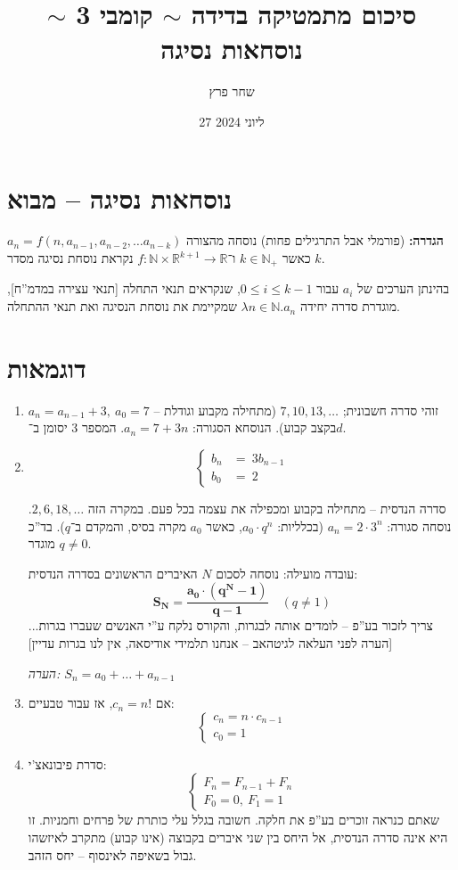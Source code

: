 \documentclass[]{article}
\author{שחר פרץ}
\title{סיכום מתמטיקה בדידה $\sim$ קומבי 3 $\sim$ נוסחאות נסיגה}
\date{27 ליוני 2024}
\newcommand\N     {\mathbb{N}}
\newcommand\R     {\mathbb{R}}
\begin{document}
	\maketitle
	
	\section{נוסחאות נסיגה – מבוא}
	\textbf{הגדרה: }(פורמלי אבל התרגילים פחות) נוסחה מהצורה $a_n = f(n, a_{n - 1}, a_{n - 2}, \dots a_{n - k})$ כאשר $k \in \N_+$ ו־$f \colon \N \times \R^{k + 1} \to \R$ נקראת נוסחת נסיגה מסדר $k$. 
	
	בהינתן הערכים של $a_i$ עבור $0 \le i \le k - 1$, שנקראים תנאי התחלה [תנאי עצירה במדמ''ח], מוגדרת סדרה יחידה $\lambda n \in \N. a_n$ שמקיימת את נוסחת הנסיגה ואת תנאי ההתחלה. 
	
	\section{דוגמאות}
	\begin{enumerate}
		\item $a_n = a_{n - 1} + 3, \ a_0 = 7$ – 
		זוהי סדרה חשבונית; $7, 10, 13, \dots $ (מתחילה מקבוע וגודלת בקצב קבוע). הנוסחא הסגורה: $a_n = 7 + 3n $. המספר $3$ יסומן ב־$d$. 
		\item \[ \begin{cases}
			b_n &= \ 3b_{n - 1} \\
			b_0 &= \ 2
		\end{cases} \]
		
		סדרה הנדסית – מתחילה בקבוע ומכפילה את עצמה בכל פעם. במקרה הזה $ 2, 6, 18, \dots $. נוסחה סגורה: $a_n = 2 \cdot 3^n $ (בכלליות: $a_0 \cdot q^n$, כאשר $a_0 $ מקרה בסיס, והמקדם ב־$q$). בד''כ מוגדר $q \neq 0 $. 
		
		עובדה מועילה: נוסחה לסכום $N$ האיברים הראשונים בסדרה הנדסית: 
		\[ \bm{S_N = \frac{a_0 \cdot (q^N - 1)}{q - 1}} \quad (q \neq 1) \]
		צריך לזכור בע''פ -- לומדים אותה לבגרות, והקורס נלקח ע''י האנשים שעברו בגרות...  [הערה לפני העלאה לגיטהאב – אנחנו תלמידי אודיסאה, אין לנו בגרות עדיין]
		
		\textit{הערה: $S_n = a_0 + \dots + a_{n - 1}$}
		\item אם $c_n = n!$, אז עבור טבעיים: 
		\[ \begin{cases}
			c_n = n \cdot c_{n - 1} \\
			c_0 = 1
		\end{cases} \]
		\item סדרת פיבונאצ'י: 
		\[ \begin{cases}
			F_n = F_{n - 1} + F_n \\
			F_0 = 0, \ F_1 = 1
		\end{cases} \]
		שאתם כנראה זוכרים בע''פ את חלקה. חשובה בגלל עלי כותרת של פרחים וחמניות. זו היא אינה סדרה הנדסית, אל היחס בין שני איברים בקבוצה (אינו קבוע) מתקרב לאיזשהו גבול בשאיפה לאינסוף – יחס הזהב. 
	\end{enumerate}
	
\end{document}
